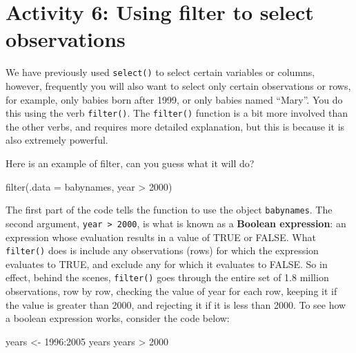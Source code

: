 \documentclass[
  oneside]{book}
\newenvironment{Shaded}{\begin{snugshade}}{\end{snugshade}}
\newcommand{\AttributeTok}[1]{\textcolor[rgb]{0.77,0.63,0.00}{#1}}
\newcommand{\DecValTok}[1]{\textcolor[rgb]{0.00,0.00,0.81}{#1}}
\newcommand{\FunctionTok}[1]{\textcolor[rgb]{0.00,0.00,0.00}{#1}}
\newcommand{\NormalTok}[1]{#1}
\newcommand{\OtherTok}[1]{\textcolor[rgb]{0.56,0.35,0.01}{#1}}
\newcommand{\SpecialCharTok}[1]{\textcolor[rgb]{0.00,0.00,0.00}{#1}}
\begin{document}
\hypertarget{activity-6-using-filter-to-select-observations}{%
\section{Activity 6: Using filter to select observations}\label{activity-6-using-filter-to-select-observations}}

We have previously used \texttt{select()} to select certain variables or columns, however, frequently you will also want to select only certain observations or rows, for example, only babies born after 1999, or only babies named ``Mary''. You do this using the verb \texttt{filter()}. The \texttt{filter()} function is a bit more involved than the other verbs, and requires more detailed explanation, but this is because it is also extremely powerful.

Here is an example of filter, can you guess what it will do?

\begin{Shaded}
\begin{Highlighting}[]
 \FunctionTok{filter}\NormalTok{(}\AttributeTok{.data =}\NormalTok{ babynames, year }\SpecialCharTok{\textgreater{}} \DecValTok{2000}\NormalTok{)}
\end{Highlighting}
\end{Shaded}

The first part of the code tells the function to use the object \texttt{babynames}. The second argument, \texttt{year\ \textgreater{}\ 2000}, is what is known as a \textbf{Boolean expression}: an expression whose evaluation results in a value of TRUE or FALSE. What \texttt{filter()} does is include any observations (rows) for which the expression evaluates to TRUE, and exclude any for which it evaluates to FALSE. So in effect, behind the scenes, \texttt{filter()} goes through the entire set of 1.8 million observations, row by row, checking the value of year for each row, keeping it if the value is greater than 2000, and rejecting it if it is less than 2000. To see how a boolean expression works, consider the code below:

\begin{Shaded}
\begin{Highlighting}[]
\NormalTok{years }\OtherTok{\textless{}{-}} \DecValTok{1996}\SpecialCharTok{:}\DecValTok{2005}
\NormalTok{years}
\NormalTok{years }\SpecialCharTok{\textgreater{}} \DecValTok{2000}
\end{Highlighting}
\end{Shaded}
\end{document}

